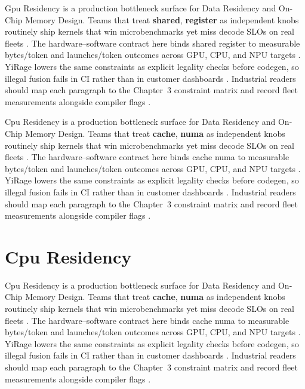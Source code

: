 Gpu Residency is a production bottleneck surface for Data Residency and On-Chip Memory Design. Teams that treat \textbf{shared}, \textbf{register} as independent knobs routinely ship kernels that win microbenchmarks yet miss decode SLOs on real fleets \citep{patel2025llminference,nvidia2022hopper}. The hardware--software contract here binds shared register to measurable bytes/token and launches/token outcomes across GPU, CPU, and NPU targets \citep{taxbreak2026,semianalysis2024tma}. YiRage lowers the same constraints as explicit legality checks before codegen, so illegal fusion fails in CI rather than in customer dashboards \citep{memoryfloor2026,amd2024xdna}. Industrial readers should map each paragraph to the Chapter~3 constraint matrix and record fleet measurements alongside compiler flags \citep{nvidia2022hopper,amd2024aie}.

Cpu Residency is a production bottleneck surface for Data Residency and On-Chip Memory Design. Teams that treat \textbf{cache}, \textbf{numa} as independent knobs routinely ship kernels that win microbenchmarks yet miss decode SLOs on real fleets \citep{taxbreak2026,semianalysis2024tma}. The hardware--software contract here binds cache numa to measurable bytes/token and launches/token outcomes across GPU, CPU, and NPU targets \citep{memoryfloor2026,amd2024xdna}. YiRage lowers the same constraints as explicit legality checks before codegen, so illegal fusion fails in CI rather than in customer dashboards \citep{nvidia2022hopper,amd2024aie}. Industrial readers should map each paragraph to the Chapter~3 constraint matrix and record fleet measurements alongside compiler flags \citep{semianalysis2024tma,dlbook}.

\section{Cpu Residency}
\label{sec:cpu_residency}

Cpu Residency is a production bottleneck surface for Data Residency and On-Chip Memory Design. Teams that treat \textbf{cache}, \textbf{numa} as independent knobs routinely ship kernels that win microbenchmarks yet miss decode SLOs on real fleets \citep{memoryfloor2026,amd2024xdna}. The hardware--software contract here binds cache numa to measurable bytes/token and launches/token outcomes across GPU, CPU, and NPU targets \citep{nvidia2022hopper,amd2024aie}. YiRage lowers the same constraints as explicit legality checks before codegen, so illegal fusion fails in CI rather than in customer dashboards \citep{semianalysis2024tma,dlbook}. Industrial readers should map each paragraph to the Chapter~3 constraint matrix and record fleet measurements alongside compiler flags \citep{amd2024xdna,dao2022flashattention}.

